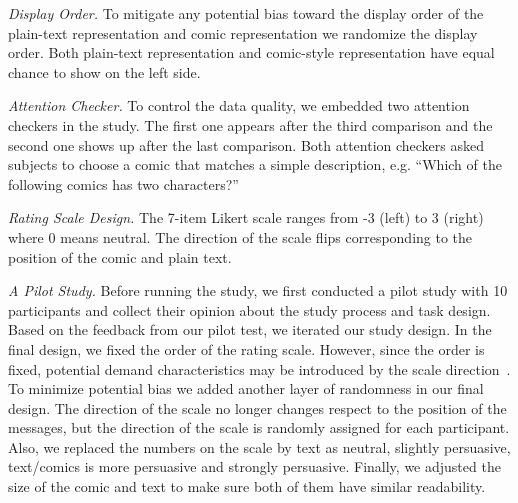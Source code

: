\textit{Display Order.} To mitigate any potential bias toward the display order of the plain-text representation and comic representation we randomize the display order. Both plain-text representation and comic-style representation have equal chance to show on the left side.

\textit{Attention Checker.} To control the data quality, we embedded two attention checkers in the study. The first one appears after the third comparison and the second one shows up after the last comparison. Both attention checkers asked subjects to choose a comic that matches a simple description, e.g. ``Which of the following comics has two characters?''

\textit{Rating Scale Design.} The 7-item Likert scale ranges from -3 (left) to 3 (right) where 0 means neutral. The direction of the scale flips corresponding to the position of the comic and plain text.

\textit{A Pilot Study.} Before running the study, we first conducted a pilot study with 10 participants and collect their opinion about the study process and task design. Based on the feedback from our pilot test, we iterated our study design. In the final design, we fixed the order of the rating scale. However, since the order is fixed, potential demand characteristics may be introduced by the scale direction~\cite{orne1962social}. To minimize potential bias we added another layer of randomness in our final design. The direction of the scale no longer changes respect to the position of the messages, but the direction of the scale is randomly assigned for each participant. Also, we replaced the numbers on the scale by text as neutral, slightly persuasive, text/comics is more persuasive and strongly persuasive. Finally, we adjusted the size of the comic and text to make sure both of them have similar readability.
%



